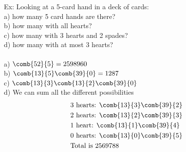 Ex: Looking at a 5-card hand in a deck of cards:\\
a) how many 5 card hands are there?\\
b) how many with all hearts?\\
c) how many with 3 hearts and 2 spades?\\
d) how many with at most 3 hearts?\\
\\
a) $\comb{52}{5}=2598960$\\
b) $\comb{13}{5}\comb{39}{0}=1287$\\
c) $\comb{13}{3}\comb{13}{2}\comb{39}{0}$\\
d) We can sum all the different possibilities
\begin{align*}
    &\text{3 hearts: }\comb{13}{3}\comb{39}{2}\\
    &\text{2 hearts: } \comb{13}{2}\comb{39}{3}\\
    &\text{1 heart: }\comb{13}{1}\comb{39}{4}\\
    &\text{0 hearts: }\comb{13}{0}\comb{39}{5}\\
    &\text{Total is }2569788
\end{align*}

